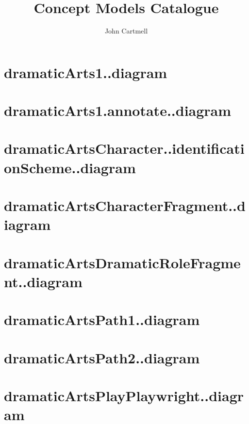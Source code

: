 \documentclass[10pt,a4paper]{article}
\author{ John Cartmell}
\title{Concept Models Catalogue}
\begin{document}
\maketitle

\tableofcontents

\section{dramaticArts1..diagram}

\newline
\section{dramaticArts1.annotate..diagram}

\newline
\section{dramaticArtsCharacter..identificationScheme..diagram}

\newline
\section{dramaticArtsCharacterFragment..diagram}

\newline
\section{dramaticArtsDramaticRoleFragment..diagram}

\newline
\section{dramaticArtsPath1..diagram}

\newline
\section{dramaticArtsPath2..diagram}

\newline
\section{dramaticArtsPlayPlaywright..diagram}

\newline
\end{document}
